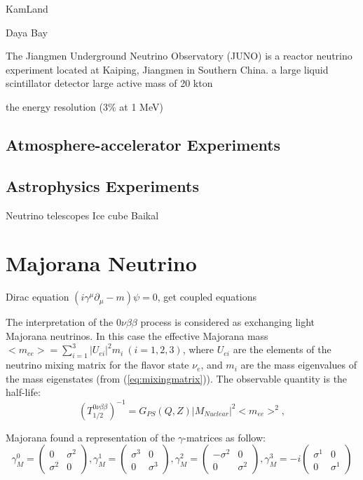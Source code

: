 KamLand

Daya Bay

The Jiangmen Underground Neutrino Observatory (JUNO) is a reactor neutrino experiment located at Kaiping, Jiangmen in Southern China. a large liquid scintillator detector 
large active mass of 20 kton

the energy resolution (3\% at 1 MeV) 
\cite{giaz2018status}

\subsection{Atmosphere-accelerator Experiments}



\subsection{Astrophysics Experiments}
Neutrino telescopes
Ice cube
Baikal 





\section{Majorana Neutrino}

Dirac equation $(i\gamma^\mu\partial_\mu-m)\psi=0$,
get coupled equations


The interpretation of the $0\nu\beta\beta$ process is considered as exchanging light Majorana neutrinos. In this case the effective Majorana mass $<m_{ee}>=\sum_{i=1}^{3} |U_{ei}|^2m_i~(i=1,2,3)$, where $U_{ei}$ are the elements of the neutrino mixing matrix for the flavor state $\nu_e$, and $m_i$ are the mass eigenvalues of the mass eigenstates (from (\ref{eq:mixingmatrix})). The observable quantity is the half-life:
\[
(T^{0\nu\beta\beta}_{1/2})^{-1} = G_{PS}(Q,Z)|M_{Nuclear}|^2<m_{ee}>^2, 
\]



Majorana found a representation of the $\gamma$-matrices as follow:
\[
\gamma_M^0 = \begin{pmatrix} 
0 & \sigma^2 \\
\sigma^2 & 0
\end{pmatrix},
\gamma_M^1 = \begin{pmatrix} 
\sigma^3 & 0 \\
0 & \sigma^3
\end{pmatrix},
\gamma_M^2 = \begin{pmatrix} 
-\sigma^2 & 0 \\
0 & \sigma^2
\end{pmatrix},
\gamma_M^3 = -i\begin{pmatrix} 
\sigma^1 & 0 \\
0 & \sigma^1
\end{pmatrix}
\]


